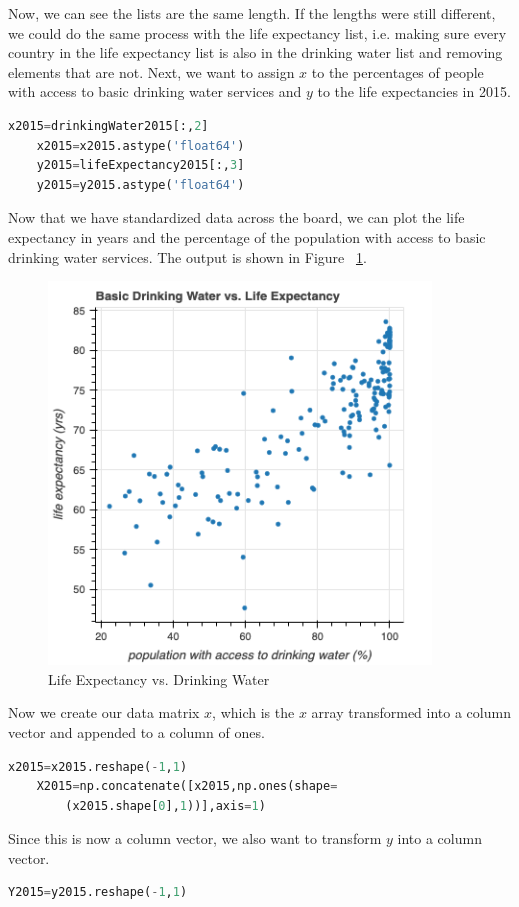 \documentclass[12pt]{article}
\begin{document}
Now, we can see the lists are the same length. If the lengths were still different, we could do the same process with the life expectancy list, i.e. making sure every country in the life expectancy list is also in the drinking water list and removing elements that are not. Next, we want to assign $x$ to the percentages of people with access to basic drinking water services and $y$ to the life expectancies in 2015.
\begin{lstlisting}[language=Python]
    x2015=drinkingWater2015[:,2]
    x2015=x2015.astype('float64')
    y2015=lifeExpectancy2015[:,3]
    y2015=y2015.astype('float64')
\end{lstlisting}

Now that we have standardized data across the board, we can plot the life expectancy in years and the percentage of the population with access to basic drinking water services. The output is shown in Figure ~\ref{fig3}.
\begin{figure}
    \centering
    \includegraphics[width=4in]{Figures/figure1.png}
    \caption{Life Expectancy vs. Drinking Water}
    \label{fig3}
\end{figure}

Now we create our data matrix $x$, which is the $x$ array transformed into a column vector and appended to a column of ones.
\begin{lstlisting}[language=Python]
    x2015=x2015.reshape(-1,1)
    X2015=np.concatenate([x2015,np.ones(shape=
        (x2015.shape[0],1))],axis=1)
\end{lstlisting}

Since this is now a column vector, we also want to transform $y$ into a column vector.
\begin{lstlisting}[language=Python]
    Y2015=y2015.reshape(-1,1)
\end{lstlisting}
\end{document}
